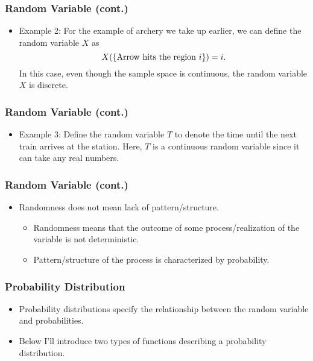 \documentclass[pdflatex, 12pt]{beamer}
\begin{document}
\begin{frame}
\frametitle{Random Variable (cont.)}
\begin{itemize}
\item Example 2: For the example of archery we take up earlier, we can define the random variable $X$ as 
 \begin{equation}
 X(\left\{\mathrm{Arrow \ hits \ the \ region \ }i\right\}) = i. \notag
 \end{equation}
In this case, even though the sample space is continuous, the random variable $X$ is discrete.
\end{itemize}
\end{frame}

\begin{frame}
\frametitle{Random Variable (cont.)}
\begin{itemize}
\item Example 3: Define the random variable $T$ to denote the time until the next train arrives at the station. Here, $T$ is a continuous random variable since it can take any real numbers.
\end{itemize}
\end{frame}

\begin{frame}
\frametitle{Random Variable (cont.)}
\begin{itemize}
\item Randomness does not mean lack of pattern/structure.
 \begin{itemize}
 \item Randomness means that the outcome of some process/realization of the variable is not deterministic.
 \item Pattern/structure of the process is characterized by probability.
 \end{itemize}
\end{itemize}
\end{frame}

\begin{frame}
\frametitle{Probability Distribution}
\begin{itemize}
\item Probability distributions specify the relationship between the random variable and probabilities.
\vspace{0.4cm}
\item Below I'll introduce two types of functions describing a probability distribution.  
\end{itemize}
\end{frame}
\end{document}
